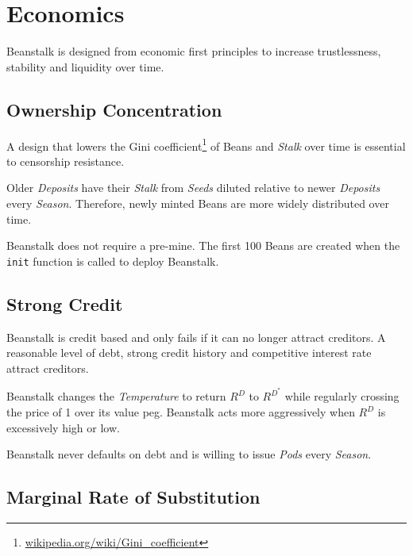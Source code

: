 \documentclass[tikz]{article}
\newcommand{\code}[1]{\texttt{#1}}
\newcommand{\term}[1]{\textsl{#1}}
\newcommand{\fref}[1]{\footnote{\href{http://#1}{#1}}}
\newcommand{\Bean}{} %
\begin{document}
\vspace*{-1.3mm}
\section{Economics}
\vspace*{-1.3mm}

Beanstalk is designed from economic first principles to increase trustlessness, stability and liquidity over time.

\vspace*{-1.3mm}
\subsection{Ownership Concentration}
\vspace*{-1.3mm}

A design that lowers the Gini coefficient\fref{wikipedia.org/wiki/Gini\_coefficient} of Beans and \term{Stalk} over time is essential to censorship resistance.

Older \term{Deposits} have their \term{Stalk} from \term{Seeds} diluted relative to newer \term{Deposits} every \term{Season}. Therefore, newly minted Beans are more widely distributed over time.

Beanstalk does not require a pre-mine. The first 100 Beans are created when the \code{init} function is called to deploy Beanstalk.

\vspace*{-1.3mm}
\subsection{Strong Credit}
\vspace*{-1.3mm}

Beanstalk is credit based and only fails if it can no longer attract creditors. A reasonable level of debt, strong credit history and competitive interest rate attract creditors. 

Beanstalk changes the \term{Temperature} to return \hyperlink{ht156}{$R^D$} to $R^{D^*}$ while regularly crossing the price of \Bean1 over its value peg. Beanstalk acts more aggressively when \hyperlink{ht156}{$R^D$} is excessively high or low.

Beanstalk never defaults on debt and is willing to issue \term{Pods} every \term{Season}. 

\vspace*{-1.3mm}
\subsection{Marginal Rate of Substitution}
\vspace*{-1.3mm}
\end{document}
